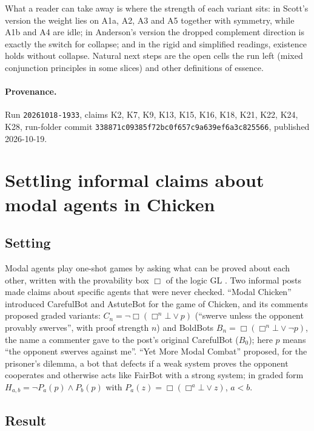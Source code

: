 \documentclass{article}
\begin{document}
What a reader can take away is where the strength of each variant sits: in Scott's version the
weight lies on A1a, A2, A3 and A5 together with symmetry, while A1b and A4 are idle; in
Anderson's version the dropped complement direction is exactly the switch for collapse; and in
the rigid and simplified readings, existence holds without collapse. Natural next steps are the
open cells the run left (mixed conjunction principles in some slices) and other definitions of
essence.

\paragraph{Provenance.}
Run \texttt{20261018-1933}, claims K2, K7, K9, K13, K15, K16, K18, K21, K22, K24, K28, run-folder commit \texttt{338871c09385f72bc0f657c9a639ef6a3c825566}, published 2026-10-19.

\section{Settling informal claims about modal agents in Chicken}
\label{sec:chicken-informal-claims}

\subsection*{Setting}

Modal agents play one-shot games by asking what can be proved about each other, written with the
provability box $\Box$ of the logic GL \cite{barasz2014robust}. Two informal posts made claims about
specific agents that were never checked. ``Modal Chicken'' \cite{gramstone2015chicken} introduced
CarefulBot and AstuteBot for the game of Chicken, and its comments proposed graded variants:
$C_n = \neg\Box(\Box^n\bot \vee p)$ (``swerve unless the opponent provably swerves'', with proof
strength $n$) and BoldBots $B_n = \Box(\Box^n\bot \vee \neg p)$, the name a commenter gave to the
post's original CarefulBot ($B_0$); here $p$ means ``the opponent swerves against me''. ``Yet More Modal Combat'' \cite{hobson2021modal} proposed, for the prisoner's
dilemma, a bot that defects if a weak system proves the opponent cooperates and otherwise acts like
FairBot with a strong system; in graded form $H_{a,b} = \neg P_a(p) \wedge P_b(p)$ with
$P_a(z) = \Box(\Box^a\bot \vee z)$, $a < b$.

\subsection*{Result}
\end{document}
